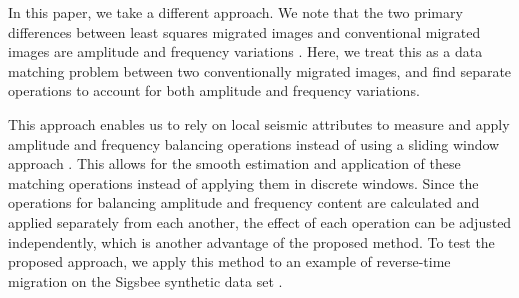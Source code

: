     In this paper, we take a different approach. 
    We note that the two primary differences between least squares migrated images and conventional migrated images are amplitude and frequency variations \cite[]{Hou2015, Hou2016}. 
    Here, we treat this as a data matching problem between two conventionally migrated images, and find separate operations to account for both amplitude and frequency variations.

    This approach enables us to rely on local seismic attributes to measure and apply amplitude and frequency balancing operations instead of using a sliding window approach \cite[]{attr}.
This allows for the smooth estimation and application of these matching operations instead of applying them in discrete windows.
    Since the operations for balancing amplitude and frequency content are calculated and applied separately from each another, the effect of each operation can be adjusted independently, which is another advantage of the proposed method.
    To test the proposed approach, we apply this method to an example of reverse-time migration on the Sigsbee synthetic data set \cite[]{sigsbee}. 

